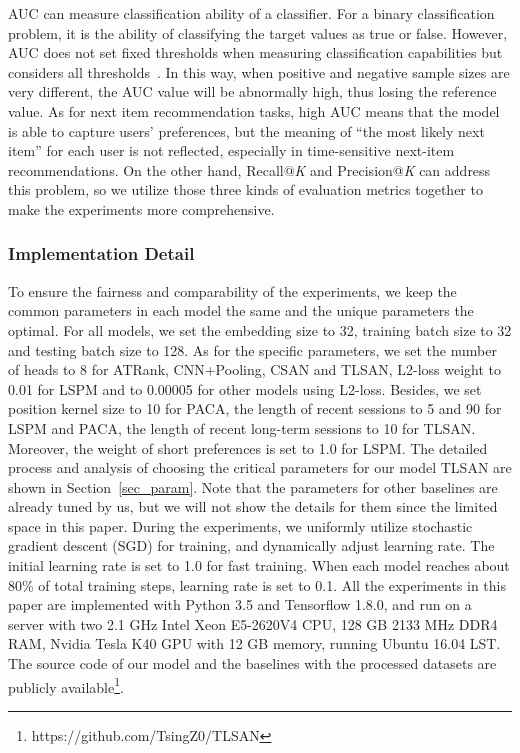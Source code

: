 \documentclass[preprint,12pt]{elsarticle}
\newcommand{\tool}{TLSAN\xspace}
\begin{document}
\begin{sloppypar}
AUC can measure classification ability of a classifier. For a binary classification problem, it is the ability of classifying the target values as true or false. However, AUC does not set fixed thresholds when measuring classification capabilities but considers all thresholds~\cite{dodd2003partial}. In this way, when positive and negative sample sizes are very different, the AUC value will be abnormally high, thus losing the reference value. As for next item recommendation tasks, high AUC means that the model is able to capture users' preferences, but the meaning of ``the most likely next item'' for each user is not reflected, especially in time-sensitive next-item recommendations. On the other hand, Recall@\emph{K} and Precision@\emph{K} can address this problem, so we utilize those three kinds of evaluation metrics together to make the experiments more comprehensive.

\subsubsection{Implementation Detail}

To ensure the fairness and comparability of the experiments, we keep the common parameters in each model the same and the unique parameters the optimal. For all models, we set the embedding size to 32, training batch size to 32 and testing batch size to 128. As for the specific parameters, we set the number of heads to 8 for ATRank, CNN+Pooling, CSAN and \tool, L2-loss weight to 0.01 for LSPM and to 0.00005 for other models using L2-loss. Besides, we set position kernel size to 10 for PACA, the length of recent sessions to 5 and 90 for LSPM and PACA, the length of recent long-term sessions to 10 for \tool. Moreover, the weight of short preferences is set to 1.0 for LSPM. The detailed process and analysis of choosing the critical parameters for our model \tool are shown in Section~\ref{sec_param}. Note that the parameters for other baselines are already tuned by us, but we will not show the details for them since the limited space in this paper. During the experiments, we uniformly utilize stochastic gradient descent (SGD) for training, and dynamically adjust learning rate. The initial learning rate is set to 1.0 for fast training. When each model reaches about 80\% of total training steps, learning rate is set to 0.1. All the experiments in this paper are implemented with Python 3.5 and Tensorflow 1.8.0, and run on a server with two 2.1 GHz Intel Xeon E5-2620V4 CPU, 128 GB 2133 MHz DDR4 RAM, Nvidia Tesla K40 GPU with 12 GB memory, running Ubuntu 16.04 LST. The source code of our model and the baselines with the processed datasets are publicly available\footnote{https://github.com/TsingZ0/TLSAN}.


\end{sloppypar}
\end{document}
